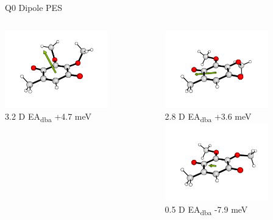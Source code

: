 \documentclass[9pt,t,xcolor=table]{beamer}
\begin{document}
\begin{frame}{\huge Q0 Dipole PES}
\begin{columns}
\begin{column}{0.5\textwidth}
			\includegraphics[width=0.7\textwidth]{Figs/Q0_90.png} \\
			{\textmu} 3.2 D EA\textsubscript{dba} +4.7 meV
		\end{column}
		\begin{column}{0.5\textwidth}
			\centering
			\includegraphics[width=0.7\textwidth]{Figs/Q0_6.png} \\
			{\textmu} 2.8 D EA\textsubscript{dba} +3.6 meV \\
			
			\includegraphics[width=0.7\textwidth]{Figs/Q0_360.png} \\
			{\textmu} 0.5 D EA\textsubscript{dba} -7.9 meV
		\end{column}
	\end{columns}
\end{frame}
\end{document}

